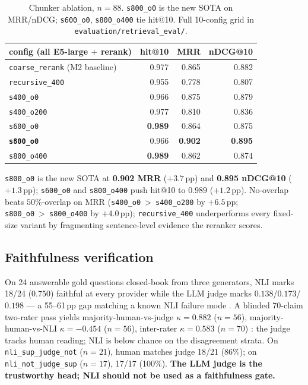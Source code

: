 \documentclass[11pt]{article}
\begin{document}
\begin{table}[h]
\centering
\footnotesize
\setlength{\tabcolsep}{3pt}
\begin{tabularx}{\columnwidth}{@{}>{\raggedright\arraybackslash}Xrrr@{}}
\toprule
config (all E5-large $+$ rerank) & hit@10 & MRR & nDCG@10 \\
\midrule
\texttt{coarse\_rerank} (M2 baseline) & 0.977 & 0.865 & 0.882 \\
\texttt{recursive\_400}                & 0.955 & 0.778 & 0.807 \\
\texttt{s400\_o0}                      & 0.966 & 0.875 & 0.879 \\
\texttt{s400\_o200}                    & 0.977 & 0.810 & 0.836 \\
\texttt{s600\_o0}                      & \textbf{0.989} & 0.864 & 0.875 \\
\textbf{\texttt{s800\_o0}}             & 0.966 & \textbf{0.902} & \textbf{0.895} \\
\texttt{s800\_o400}                    & \textbf{0.989} & 0.862 & 0.874 \\
\bottomrule
\end{tabularx}
\caption{Chunker ablation, $n{=}88$. \texttt{s800\_o0} is the new SOTA on MRR/nDCG; \texttt{s600\_o0}, \texttt{s800\_o400} tie hit@10. Full 10-config grid in \texttt{evaluation/retrieval\_eval/}.}
\label{tab:chunker}
\end{table}

\texttt{s800\_o0} is the new SOTA at \textbf{0.902 MRR} ($+3.7$\,pp) and \textbf{0.895 nDCG@10} ($+1.3$\,pp); \texttt{s600\_o0} and \texttt{s800\_o400} push hit@10 to $0.989$ ($+1.2$\,pp). No-overlap beats $50\%$-overlap on MRR (\texttt{s400\_o0}~>~\texttt{s400\_o200} by $+6.5$\,pp; \texttt{s800\_o0}~>~\texttt{s800\_o400} by $+4.0$\,pp); \texttt{recursive\_400} underperforms every fixed-size variant by fragmenting sentence-level evidence the reranker scores.

\subsection{Faithfulness verification}
\label{sec:faith}

On 24 answerable gold questions closed-book from three generators, NLI marks 18/24 ($0.750$) faithful at every provider while the LLM judge marks $0.138$/$0.173$/$0.198$ --- a 55--61\,pp gap matching a known NLI failure mode \citep{min-etal-2023-factscore,gao2023enabling}. A blinded 70-claim two-rater pass yields majority-human-vs-judge \textbf{$\kappa{=}0.882$} ($n{=}56$), majority-human-vs-NLI $\kappa{=}-0.454$ ($n{=}56$), inter-rater $\kappa{=}0.583$ ($n{=}70$) \citep{cohen1960kappa}: the judge tracks human reading; NLI is below chance on the disagreement strata. On \texttt{nli\_sup\_judge\_not} ($n{=}21$), human matches judge 18/21 (86\%); on \texttt{nli\_not\_judge\_sup} ($n{=}17$), 17/17 (100\%). \textbf{The LLM judge is the trustworthy head; NLI should not be used as a faithfulness gate.}
\end{document}
